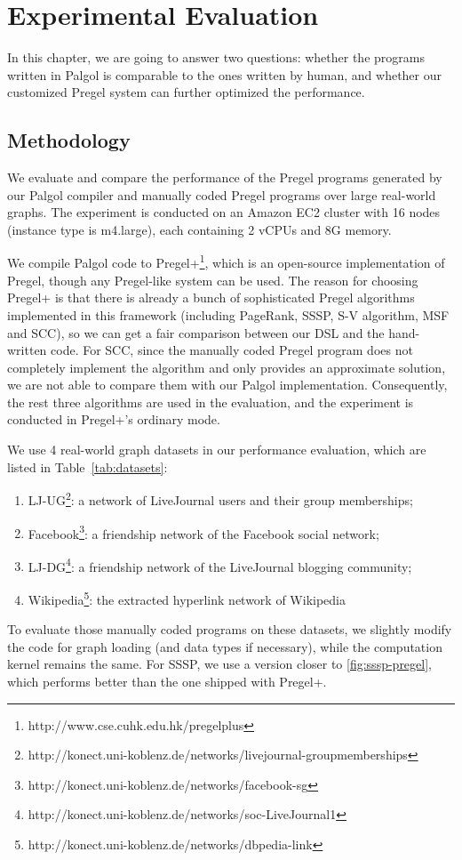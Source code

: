 \documentclass{sokendai_thesis} %
\begin{document}
\chapter{Experimental Evaluation}
\label{sec:evaluation}

In this chapter, we are going to answer two questions: whether the programs written in Palgol is comparable to the ones written by human, and whether our customized Pregel system can further optimized the performance.

\section{Methodology}

We evaluate and compare the performance of the Pregel programs generated by our Palgol compiler and manually coded Pregel programs over large real-world graphs.
The experiment is conducted on an Amazon EC2 cluster with 16 nodes (instance type is m4.large), each containing 2 vCPUs and 8G memory.

We compile Palgol code to Pregel+\footnote{http://www.cse.cuhk.edu.hk/pregelplus}, which is an open-source implementation of Pregel, though any Pregel-like system can be used.
The reason for choosing Pregel+ is that there is already a bunch of sophisticated Pregel algorithms implemented in this framework (including PageRank, SSSP, S-V algorithm, MSF and SCC), so we can get a fair comparison between our DSL and the hand-written code.
For SCC, since the manually coded Pregel program does not completely implement the algorithm and only provides an approximate solution, we are not able to compare them with our Palgol implementation.
Consequently, the rest three algorithms are used in the evaluation, and the experiment is conducted in Pregel+'s ordinary mode.

We use 4 real-world graph datasets in our performance evaluation, which are listed in Table~\ref{tab:datasets}:
\begin{enumerate}\setlength\itemsep{0em}
\item LJ-UG\footnote{http://konect.uni-koblenz.de/networks/livejournal-groupmemberships}: a network of LiveJournal users and their group memberships;
\item Facebook\footnote{http://konect.uni-koblenz.de/networks/facebook-sg}: a friendship network of the Facebook social network;
\item LJ-DG\footnote{http://konect.uni-koblenz.de/networks/soc-LiveJournal1}: a friendship network of the LiveJournal blogging community;
\item Wikipedia\footnote{http://konect.uni-koblenz.de/networks/dbpedia-link}: the extracted hyperlink network of Wikipedia
\end{enumerate}
To evaluate those manually coded programs on these datasets, we slightly modify the code for graph loading (and data types if necessary), while the computation kernel remains the same.
For SSSP, we use a version closer to \autoref{fig:sssp-pregel}, which performs better than the one shipped with Pregel+.
\end{document}
